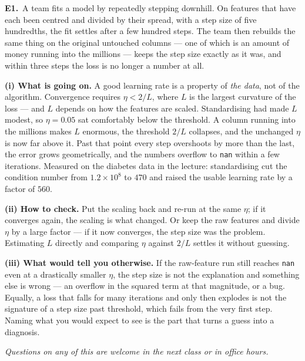 \documentclass[10pt,a4paper]{article}
\begin{document}
\textbf{E1.}\ A team fits a model by repeatedly stepping downhill. On features that have each been centred and
divided by their spread, with a step size of five hundredths, the fit settles after a few hundred steps. The
team then rebuilds the same thing on the original untouched columns --- one of which is an amount of money
running into the millions --- keeps the step size exactly as it was, and within three steps the loss is no
longer a number at all.

\vspace{4pt}

\textbf{(i) What is going on.} A good learning rate is a property of \emph{the data}, not of the algorithm. Convergence requires $\eta < 2/L$, where $L$ is the largest curvature of the loss --- and $L$ depends on how the features are scaled. Standardising had made $L$ modest, so $\eta = 0.05$ sat comfortably below the threshold. A column running into the millions makes $L$ enormous, the threshold $2/L$ collapses, and the unchanged $\eta$ is now far above it. Past that point every step overshoots by more than the last, the error grows geometrically, and the numbers overflow to \texttt{nan} within a few iterations. Measured on the diabetes data in the lecture: standardising cut the condition number from $1.2 \times 10^{8}$ to $470$ and raised the usable learning rate by a factor of $560$.\par\vspace{1mm}\textbf{(ii) How to check.} Put the scaling back and re-run at the same $\eta$; if it converges again, the scaling is what changed. Or keep the raw features and divide $\eta$ by a large factor --- if it now converges, the step size was the problem. Estimating $L$ directly and comparing $\eta$ against $2/L$ settles it without guessing.\par\vspace{1mm}\textbf{(iii) What would tell you otherwise.} If the raw-feature run still reaches \texttt{nan} even at a drastically smaller $\eta$, the step size is not the explanation and something else is wrong --- an overflow in the squared term at that magnitude, or a bug. Equally, a loss that falls for many iterations and only then explodes is not the signature of a step size past threshold, which fails from the very first step. Naming what you would expect to see is the part that turns a guess into a diagnosis.

\vfill

{\footnotesize\itshape Questions on any of this are welcome in the next class or in office hours.}
\end{document}

